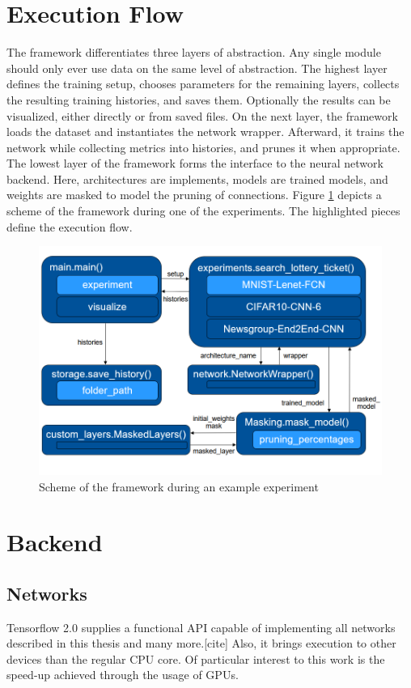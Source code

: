 \section{Execution Flow}
The framework differentiates three layers of abstraction. Any single module should only ever use data on the same level of abstraction.
The highest layer defines the training setup, chooses parameters for the remaining layers, collects the resulting training histories, and saves them. Optionally the results can be visualized, either directly or from saved files. 
On the next layer, the framework loads the dataset and instantiates the network wrapper. Afterward, it trains the network while collecting metrics into histories, and prunes it when appropriate.
The lowest layer of the framework forms the interface to the neural network backend. Here, architectures are implements, models are trained models, and weights are masked to model the pruning of connections.
Figure \ref{fig:Example Control Flow} depicts a scheme of the framework during one of the experiments. The highlighted pieces define the execution flow.

\begin{figure}
	\centering
	\includegraphics[width=450px]{gfx/chp_5_control_flow.png}
	\caption{Scheme of the framework during an example experiment}
	\label{fig:Example Control Flow}
\end{figure}
\section{Backend}
\subsection{Networks}
Tensorflow 2.0 supplies a functional API capable of implementing all networks described in this thesis and many more.[cite] Also, it brings execution to other devices than the regular CPU core. Of particular interest to this work is the speed-up achieved through the usage of GPUs. 
